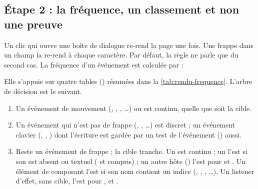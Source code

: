 \subsection{Étape 2 : la fréquence, un classement et non une preuve}

Un clic qui ouvre une boîte de dialogue re-rend la page une fois. Une frappe dans un champ la
re-rend à chaque caractère. Par défaut, la règle ne parle que du second cas. La fréquence d'un
événement est calculée par  :


Elle s'appuie sur quatre tables () résumées dans
la \cref{tab:rendu-frequence}. L'arbre de décision est le suivant.
\begin{enumerate}
  \item Un événement de mouvement (, , , \dots)
        ou  est continu, quelle que soit la cible.
  \item Un événement qui n'est pas de frappe (, , \dots)
        est discret ; un événement clavier (, , ) dont
        l'écriture est gardée par un test de l'événement () aussi.
  \item Reste un événement de frappe ; la cible tranche. Un  est continu ; un
         l'est si son  est absent ou textuel ( et
         compris) ; un autre hôte () l'est pour  et
        . Un élément de composant l'est si son nom contient un indice
        (, , , \dots). Un listener d'effet, sans
        cible, l'est pour ,  et .
\end{enumerate}

